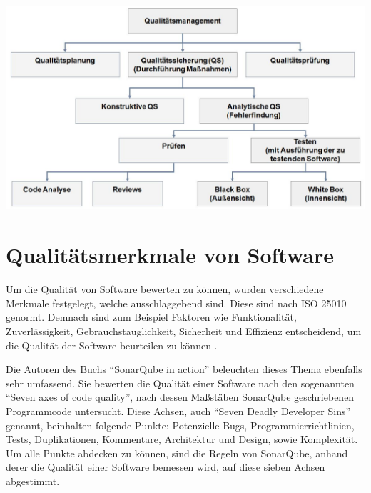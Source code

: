 \begin{minipage}{\linewidth}
	\centering
	\includegraphics[scale=0.5]{img/qs.jpg}
	\vspace{2em}
\end{minipage}




\section{Qualitätsmerkmale von Software}

Um die Qualität von Software bewerten zu können, wurden verschiedene Merkmale festgelegt, welche ausschlaggebend sind. Diese sind nach ISO 25010 genormt. Demnach sind zum Beispiel Faktoren wie Funktionalität, Zuverlässigkeit, Gebrauchstauglichkeit, Sicherheit und Effizienz entscheidend, um die Qualität der Software beurteilen zu können \autocite[Vgl.][]{Merkmale}.

Die Autoren des Buchs \enquote{SonarQube in action} beleuchten dieses Thema ebenfalls sehr umfassend. Sie bewerten die Qualität einer Software nach den sogenannten \enquote{Seven axes of code quality}\autocite[S.13]{SonarInAction}, nach dessen Maßstäben SonarQube geschriebenen Programmcode untersucht. 
Diese Achsen, auch \enquote{Seven Deadly Developer Sins}\autocite[S.13]{SonarInAction} genannt, beinhalten folgende Punkte: Potenzielle Bugs, Programmierrichtlinien, Tests, Duplikationen, Kommentare, Architektur und Design, sowie Komplexität.
Um alle Punkte abdecken zu können, sind die Regeln von SonarQube, anhand derer die Qualität einer Software bemessen wird, auf diese sieben Achsen abgestimmt.

